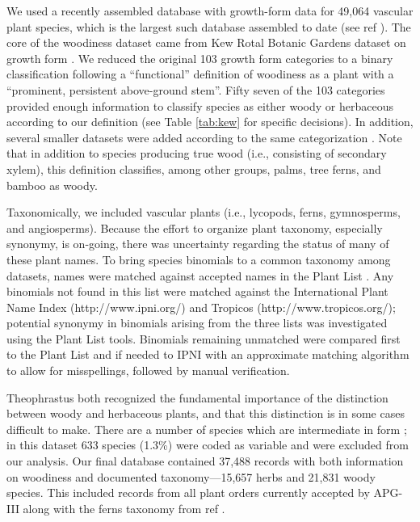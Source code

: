 \documentclass[12pt]{article}
\begin{document}
% 
We used a recently assembled database with growth-form data for 49,064
vascular plant species, which is the largest such database assembled
to date (see ref \citep{Zanne}). The core of the woodiness dataset
came from Kew Rotal Botanic Gardens dataset on growth form
\citep{Kew}.  We reduced the original 103 growth form categories to a
binary classification following a ``functional'' definition of
woodiness as a plant with a ``prominent, persistent above-ground
stem''.  Fifty seven of the 103 categories provided enough information
to classify species as either woody or herbaceous according to our
definition (see Table \ref{tab:kew} for specific decisions).  In
addition, several smaller datasets were added according to the same
categorization \citep{Zanne}.  Note that in addition to species
producing true wood (i.e., consisting of secondary xylem), this
definition classifies, among other groups, palms, tree ferns, and
bamboo as woody.

Taxonomically, we included vascular plants (i.e., lycopods, ferns,
gymnosperms, and angiosperms).
%
Because the effort to organize plant taxonomy, especially synonymy, is
on-going, there was uncertainty regarding the status of many of these
plant names.  
%
To bring species binomials to a common taxonomy among datasets, names
were matched against accepted names in the Plant List
\citep{ThePlantList}.  Any binomials not found in this list were
matched against the International Plant Name Index
(http://www.ipni.org/) and Tropicos (http://www.tropicos.org/);
potential synonymy in binomials arising from the three lists was
investigated using the Plant List tools.  
Binomials remaining unmatched were compared first to the Plant List
and if needed to IPNI with an approximate matching algorithm to allow
for misspellings, followed by manual verification.

Theophrastus both recognized the fundamental importance of the
distinction between woody and herbaceous plants, and that this
distinction is in some cases difficult to make.  There are a number of
species which are intermediate in form \citep{beaulieuHiddenRates}; in
this dataset 633 species (1.3\%) were coded as variable and were
excluded from our analysis.
%
Our final database contained 37,488 records with both information on
woodiness and documented taxonomy---15,657 herbs and 21,831 woody
species.  This included records from all plant orders currently
accepted by APG-III \citep{APG3} along with the ferns taxonomy from
ref \cite{apweb}.
\end{document}
